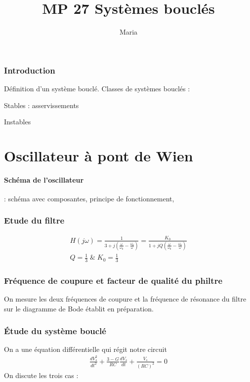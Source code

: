 \documentclass[12pt,prb,aps,epsf]{report}
\begin{document}
	
	\title{MP 27 Systèmes bouclés}
		\author{Maria}
	
	\maketitle
	
	\tableofcontents
	
	\pagebreak
\subsubsection{Introduction}
Définition d'un système bouclé. Classes de systèmes bouclés :

Stables : asservissements

Instables
\section{Oscillateur à pont de Wien}
\paragraph{Schéma de l'oscillateur} : schéma avec composantes, principe de fonctionnement, 
\subsubsection{Etude du filtre}
\begin{eqnarray}
H(j\omega) = \frac{1}{3+j\left(\frac{\omega}{\omega_0}-\frac{\omega_0}{\omega}\right)}=\frac{K_0}{1+jQ\left(\frac{\omega}{\omega_0}-\frac{\omega_0}{\omega}\right)}\\
Q = \frac{1}{3} \; \& \; K_0=\frac{1}{3}
\end{eqnarray}
\subsubsection{Fréquence de coupure et facteur de qualité du philtre}
On mesure les deux fréquences de coupure et la fréquence de résonance du filtre sur le diagramme de Bode établit en préparation.

\subsubsection{Étude du système bouclé}
On a une équation différentielle qui régit notre circuit
\begin{eqnarray}
\frac{dV_s^2}{dt^2} + \frac{3-G}{RC}\frac{dV_s}{dt} + \frac{V_s}{(RC)^2} = 0
\end{eqnarray}
On discute les trois cas :
\end{document}
